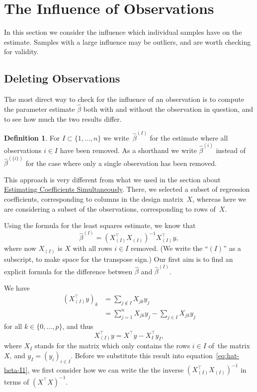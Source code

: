 \documentclass[
  a4paper,
]{article}
\theoremstyle{definition}
\newtheorem{definition}{Definition}[section]
\theoremstyle{definition}
\theoremstyle{definition}
\theoremstyle{definition}
\theoremstyle{remark}
\begin{document}
\clearpage

\hypertarget{S09-influence}{%
\section{The Influence of Observations}\label{S09-influence}}

In this section we consider the influence which individual samples have on
the estimate. Samples with a large influence may be outliers, and are
worth checking for validity.

\hypertarget{deleting}{%
\subsection{Deleting Observations}\label{deleting}}

The most direct way to check for the influence of an observation
is to compute the parameter estimate \(\hat\beta\) both with and without
the observation in question, and to see how much the two results differ.

\begin{definition}
For \(I \subset \{1, \ldots, n\}\) we write~\(\hat\beta^{(I)}\) for the estimate
where all observations \(i\in I\) have been removed. As a shorthand we write
\(\hat\beta^{(i)}\) instead of \(\hat\beta^{(\{i\})}\) for the case where only
a single observation has been removed.
\end{definition}

This approach is very different from what we used in the
section about \protect\hyperlink{S06-simultaneous}{Estimating Coefficients Simultaneously}. There, we selected a
subset of regression coefficients, corresponding to columns in the design
matrix~\(X\), whereas here we are considering a subset of the observations,
corresponding to rows of~\(X\).

Using the formula for the least squares estimate, we know that
\begin{equation}
  \hat\beta^{(I)}
  = (X_{(I)}^\top X_{(I)})^{-1} X_{(I)}^\top y,  \label{eq:hat-beta-I1}
\end{equation}
where now \(X_{(I)}\) is \(X\) with all rows \(i\in I\) removed. (We write the
``\((I)\)'' as a subscript, to make space for the transpose sign.) Our first aim
is to find an explicit formula for the difference between \(\hat\beta\) and
\(\hat\beta^{(I)}\).

We have
\begin{align*}
  (X_{(I)}^\top y)_k
  &= \sum_{j \notin I} X_{jk} y_j \\
  &= \sum_{j=1}^n X_{jk} y_j - \sum_{j\in I} X_{jk} y_j
\end{align*}
for all \(k \in \{0, \ldots, p\}\), and thus
\begin{equation}
  X_{(I)}^\top y
  = X^\top y - X_I^\top y_I,  \label{eq:X-I-top-y}
\end{equation}
where \(X_I\) stands for the matrix which only contains the rows \(i\in I\) of~the
matrix \(X\), and \(y_I = (y_i)_{i\in I}\). Before we substitute this result into
equation~\eqref{eq:hat-beta-I1}, we first consider how we can write the the
inverse \((X_{(I)}^\top X_{(I)})^{-1}\) in terms of \((X^\top X)^{-1}\).
\end{document}
